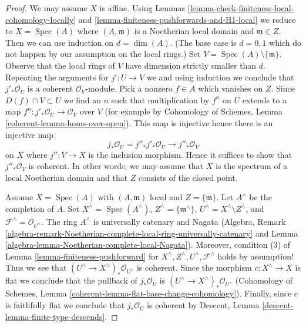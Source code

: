 \documentclass{stacks-project}
\theoremstyle{plain}
\theoremstyle{definition}
\theoremstyle{remark}
\numberwithin{equation}{subsection}
\def\Spec{\mathop{\mathrm{Spec}}}
\begin{document}
\begin{proof}
We may assume $X$ is affine.
Using Lemmas \ref{lemma-check-finiteness-local-cohomology-locally} and
\ref{lemma-finiteness-pushforwards-and-H1-local} we reduce to
$X = \Spec(A)$ where $(A, \mathfrak m)$ is a Noetherian local domain
and $\mathfrak m \in Z$.
Then we can use induction on $d = \dim(A)$.
(The base case is $d = 0, 1$ which do not happen by
our assumption on the local rings.)
Set $V = \Spec(A) \setminus \{\mathfrak m\}$.
Observe that the local rings of $V$ have dimension strictly smaller than $d$.
Repeating the arguments for $j' : U \to V$ we
and using induction we conclude that $j'_*\mathcal{O}_U$ is
a coherent $\mathcal{O}_V$-module.
Pick a nonzero $f \in A$ which vanishes on $Z$.
Since $D(f) \cap V \subset U$ we find an $n$ such that
multiplication by $f^n$ on $U$ extends to a map
$f^n : j'_*\mathcal{O}_U \to \mathcal{O}_V$ over $V$
(for example by Cohomology of Schemes, Lemma
\ref{coherent-lemma-homs-over-open}). This map is injective
hence there is an injective map
$$
j_*\mathcal{O}_U = j''_* j'_* \mathcal{O}_U \to j''_*\mathcal{O}_V
$$
on $X$ where $j'' : V \to X$ is the inclusion morphism.
Hence it suffices to show that $j''_*\mathcal{O}_V$ is coherent.
In other words, we may assume that $X$ is the spectrum
of a local Noetherian domain and that $Z$
consists of the closed point.

\medskip\noindent
Assume $X = \Spec(A)$ with $(A, \mathfrak m)$ local and $Z = \{\mathfrak m\}$.
Let $A^\wedge$ be the completion of $A$.
Set $X^\wedge = \Spec(A^\wedge)$, $Z^\wedge = \{\mathfrak m^\wedge\}$,
$U^\wedge = X^\wedge \setminus Z^\wedge$, and
$\mathcal{F}^\wedge = \mathcal{O}_{U^\wedge}$.
The ring $A^\wedge$ is universally catenary and Nagata (Algebra, Remark
\ref{algebra-remark-Noetherian-complete-local-ring-universally-catenary} and
Lemma \ref{algebra-lemma-Noetherian-complete-local-Nagata}).
Moreover, condition (3) of Lemma \ref{lemma-finiteness-pushforward}
for $X^\wedge, Z^\wedge, U^\wedge, \mathcal{F}^\wedge$
holds by assumption! Thus we see that
$(U^\wedge \to X^\wedge)_*\mathcal{O}_{U^\wedge}$
is coherent. Since the morphism $c : X^\wedge \to X$
is flat we conclude that the pullback of $j_*\mathcal{O}_U$ is
$(U^\wedge \to X^\wedge)_*\mathcal{O}_{U^\wedge}$
(Cohomology of Schemes, Lemma
\ref{coherent-lemma-flat-base-change-cohomology}).
Finally, since $c$ is faithfully flat we conclude that
$j_*\mathcal{O}_U$ is coherent by
Descent, Lemma \ref{descent-lemma-finite-type-descends}.
\end{proof}
\end{document}
